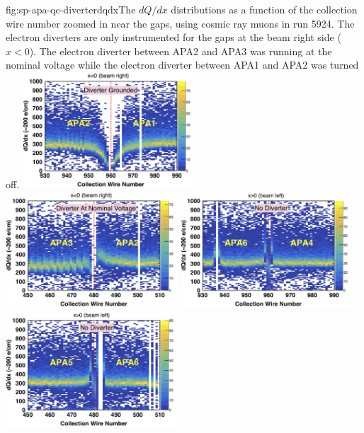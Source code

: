 \begin{dunefigure}
{fig:sp-apa-qc-diverterdqdx}{The $dQ/dx$ distributions as a function of the collection wire number zoomed in near the gaps, using cosmic ray muons in  run 5924. The electron diverters are only instrumented for the gaps at the beam right side ($x<0$). The electron diverter between APA2 and APA3 was running at the nominal voltage while the electron diverter between APA1 and APA2 was turned off. }
\includegraphics[width=0.48\textwidth]{graphics/sp-apa-dQdxAPA12.png}
\includegraphics[width=0.48\textwidth]{graphics/sp-apa-dQdxAPA32.png}
\includegraphics[width=0.48\textwidth]{graphics/sp-apa-dQdxAPA46.png}
\includegraphics[width=0.48\textwidth]{graphics/sp-apa-dQdxAPA56.png}
\end{dunefigure}
    

